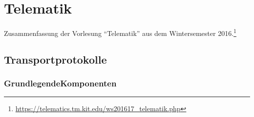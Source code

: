 \chapter{Telematik}

Zusammenfassung der Vorlesung "`Telematik"' aus dem Wintersemester 2016.\footnote{\url{https://telematics.tm.kit.edu/ws201617_telematik.php}}

\section{Transportprotokolle}

\subsection{GrundlegendeKomponenten}

